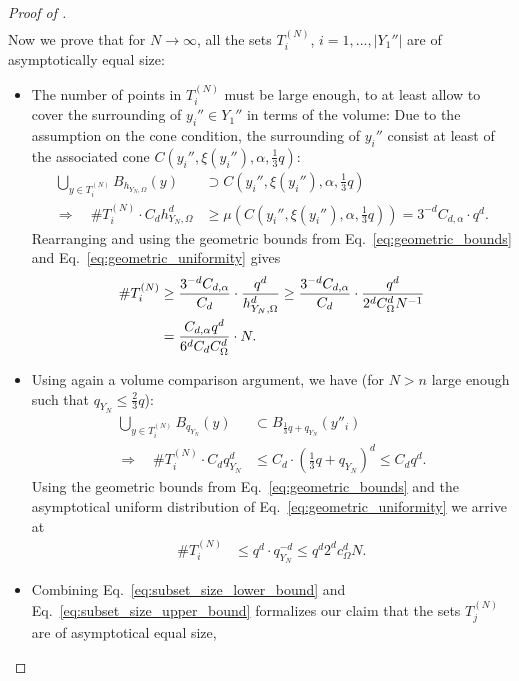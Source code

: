 \documentclass[a4paper, 10pt]{article}
\begin{document}
\begin{proof}[Proof of ]
\begin{align*}
\end{align*}
Now we prove that for $N \rightarrow \infty$, all the sets $T_i^{(N)}$, $i=1, ..., |Y_1''|$ are of asymptotically equal size:
\begin{itemize}
\item The number of points in $T_i^{(N)}$ must be large enough, to at least allow to cover the surrounding of $y_i'' \in Y_1''$ in terms of the volume:
Due to the assumption on the cone condition, 
the surrounding of $y_i''$ consist at least of the associated cone $C(y_i'', \xi(y_i''), \alpha, \frac{1}{3} q)$:
%
\begin{align*}
\bigcup_{y \in T_i^{(N)}} B_{h_{Y_N, \Omega}}(y) &\supset C(y_i'', \xi(y_i''), \alpha, \frac{1}{3}q) \\
\Rightarrow \quad \#T_i^{(N)} \cdot C_d h_{Y_N, \Omega}^{d} &\geq \mu(C(y_i'', \xi(y_i''), \alpha, \frac{1}{3}q)) = 3^{-d} C_{d, \alpha} \cdot q^d.
\end{align*}
Rearranging and using the geometric bounds from Eq.\ \eqref{eq:geometric_bounds} and Eq.\ \eqref{eq:geometric_uniformity} gives
\begin{align}
\label{eq:subset_size_lower_bound}
\# T_i^{(N)} &\geq \frac{3^{-d} C_{d, \alpha}}{C_d} \cdot \frac{q^d}{h_{Y_N, \Omega}^d}
\geq \frac{3^{-d} C_{d, \alpha}}{C_d} \cdot \frac{q^d}{2^d C_\Omega^d N^{-1}} \notag \\
&= \frac{C_{d, \alpha} q^d}{6^d C_d C_\Omega^d} \cdot N.
\end{align}
\item Using again a volume comparison argument, we have (for $N > n$ large enough such that $q_{Y_N} \leq \frac{2}{3} q$):
\begin{align*}
%
\bigcup_{y \in T_i^{(N)}} B_{q_{Y_N}}(y) &\subset B_{\frac{1}{3}q + q_{Y_N}}(y''_i) \\
\Rightarrow \quad \#T_i^{(N)} \cdot C_d q_{Y_N}^d &\leq C_d \cdot \left( \frac{1}{3}q + q_{Y_N} \right)^d \leq C_d q^d.
\end{align*}
Using the geometric bounds from Eq.\ \eqref{eq:geometric_bounds} and the asymptotical uniform distribution of Eq.\ \eqref{eq:geometric_uniformity} we arrive at
\begin{align}
\label{eq:subset_size_upper_bound}
\#T_i^{(N)} &\leq q^d \cdot q_{Y_N}^{-d} \leq q^d 2^d c_\Omega^d N.
\end{align}
\item Combining Eq.\ \eqref{eq:subset_size_lower_bound} and Eq.\ \eqref{eq:subset_size_upper_bound} formalizes our claim that the sets $T_j^{(N)}$ are of asymptotical equal size, 

\end{itemize}
\end{proof}
\end{document}
